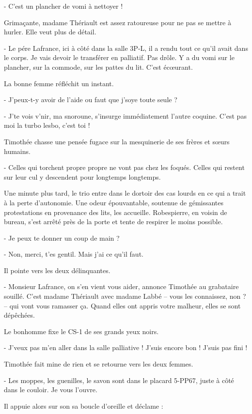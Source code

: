- C’est un plancher de vomi à nettoyer !

Grimaçante, madame Thériault est assez ratoureuse pour ne pas se mettre à hurler. Elle veut plus de détail.

- Le pére Lafrance, ici à côté dans la salle 3P-L, il a rendu tout ce qu’il avait dans le corps. Je vais devoir le transférer en palliatif. Pas drôle. Y a du vomi sur le plancher, sur la commode, sur les pattes du lit. C’est écœurant.

La bonne femme réfléchit un instant.

- J’peux-t-y avoir de l’aide ou faut que j’soye toute seule ?

- J’te vois v’nir, ma snoroune, s’insurge immédiatement l’autre coquine. C’est pas moi la turbo lesbo, c’est toi !

Timothée chasse une pensée fugace sur la mesquinerie de ses frères et sœurs humains.

- Celles qui torchent propre propre ne vont pas chez les foqués. Celles qui restent sur leur cul y descendent pour longtemps longtemps.

Une minute plus tard, le trio entre dans le dortoir des cas lourds en ce qui a trait à la perte d’autonomie. Une odeur épouvantable, soutenue de gémissantes protestations en provenance des lits, les accueille. Robespierre, en voisin de bureau, s’est arrêté près de la porte et tente de respirer le moins possible.

- Je peux te donner un coup de main ?

- Non, merci, t’es gentil. Mais j’ai ce qu’il faut.

Il pointe vers les deux délinquantes.

- Monsieur Lafrance, on s’en vient vous aider, annonce Timothée au grabataire souillé. C’est madame Thériault avec madame Labbé – vous les connaissez, non ? – qui vont vous ramasser ça. Quand elles ont appris votre malheur, elles se sont dépêchées.

Le bonhomme fixe le CS-1 de ses grands yeux noirs.

- J’veux pas m’en aller dans la salle palliative ! J’suis encore bon ! J’suis pas fini !

Timothée fait mine de rien et se retourne vers les deux femmes.

- Les moppes, les guenilles, le savon sont dans le placard 5-PP67, juste à côté dans le couloir. Je vous l’ouvre.

Il appuie alors sur son sa boucle d’oreille et déclame :

